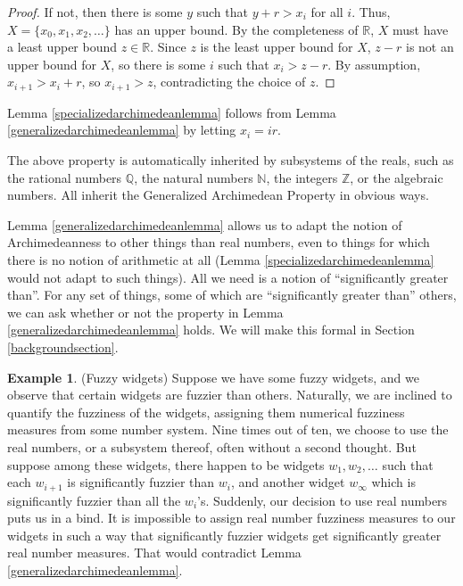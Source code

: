 \documentclass[reqno]{article}
\theoremstyle{definition}
\newtheorem{example}[theorem]{Example}
\begin{document}
\begin{proof}
If not, then there is some $y$ such that $y+r > x_i$ for all $i$.
Thus, $X=\{x_0,x_1,x_2,\ldots\}$ has an upper bound. By the completeness
of $\mathbb R$, $X$ must have a least upper bound $z\in\mathbb R$.
Since $z$ is the least upper bound for $X$, $z-r$ is not an upper bound
for $X$, so there is some $i$ such that $x_i>z-r$.
By assumption, $x_{i+1}>x_i+r$, so $x_{i+1}>z$, contradicting the choice
of $z$.
\end{proof}

Lemma \ref{specializedarchimedeanlemma} follows from
Lemma \ref{generalizedarchimedeanlemma} by letting $x_i=ir$.

The above property is automatically inherited by subsystems
of the reals, such as the rational numbers $\mathbb Q$, the natural
numbers $\mathbb N$, the integers $\mathbb Z$, or the algebraic numbers.
All inherit the Generalized Archimedean Property in obvious ways.

Lemma \ref{generalizedarchimedeanlemma} allows us to adapt the notion
of Archimedeanness to other things than real numbers, even to things
for which there is no notion of arithmetic at all
(Lemma \ref{specializedarchimedeanlemma} would not adapt to such things).
All we need is a notion of ``significantly greater than''.
For any set of things, some of which are ``significantly greater than''
others, we can ask whether or not the property in Lemma
\ref{generalizedarchimedeanlemma} holds. We will make this formal in
Section \ref{backgroundsection}.

\begin{example}
\label{fuzzywidgets}
(Fuzzy widgets)
Suppose we have some fuzzy widgets, and we observe that certain
widgets are fuzzier than others. Naturally, we are inclined to
quantify the fuzziness of the widgets, assigning them numerical
fuzziness measures from some number system. Nine times out of ten,
we choose to use the real numbers, or a subsystem thereof,
often without a second thought. But suppose
among these widgets, there happen to be widgets $w_1,w_2,\ldots$
such that each $w_{i+1}$ is significantly fuzzier than $w_i$,
and another widget $w_\infty$ which is significantly fuzzier than all the $w_i$'s.
Suddenly, our decision to use real numbers puts us in a bind.
It is impossible to assign real number fuzziness measures to our
widgets in such a way that significantly fuzzier widgets get
significantly greater real number measures. That would
contradict Lemma \ref{generalizedarchimedeanlemma}.
\end{example}
\end{document}
